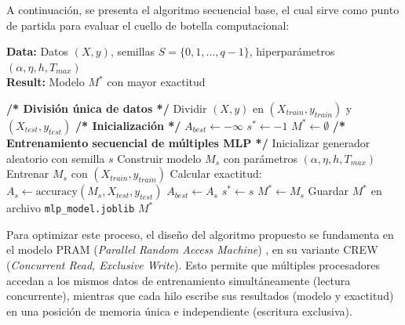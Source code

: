 \documentclass[11pt, a4paper]{article}
\begin{document}
A continuación, se presenta el algoritmo secuencial base, el cual sirve como punto de partida para evaluar el cuello de botella computacional:

\begin{algorithm}[H]
\caption{Entrenamiento secuencial de múltiples MLP con distintas semillas}
\textbf{Data:} Datos $(X, y)$, semillas $S = \{0, 1, \dots, q - 1\}$, hiperparámetros $(\alpha, \eta, h, T_{max})$\\
\textbf{Result:} Modelo $M^*$ con mayor exactitud
\begin{algorithmic}[1]
\State \textbf{/* División única de datos */}
\State Dividir $(X, y)$ en $(X_{train}, y_{train})$ y $(X_{test}, y_{test})$
\State \textbf{/* Inicialización */}
\State $A_{best} \gets -\infty$
\State $s^* \gets -1$
\State $M^* \gets \emptyset$
\State \textbf{/* Entrenamiento secuencial de múltiples MLP */}
    \State Inicializar generador aleatorio con semilla $s$
    \State Construir modelo $M_s$ con parámetros $(\alpha, \eta, h, T_{max})$
    \State Entrenar $M_s$ con $(X_{train}, y_{train})$
    \State Calcular exactitud: $A_s \gets \text{accuracy}(M_s, X_{test}, y_{test})$
        \State $A_{best} \gets A_s$
        \State $s^* \gets s$
        \State $M^* \gets M_s$
    \EndIf
\EndFor
\State Guardar $M^*$ en archivo \texttt{mlp\_model.joblib}
\State \Return $M^*$
\end{algorithmic}
\end{algorithm}


Para optimizar este proceso, el diseño del algoritmo propuesto se fundamenta en el modelo PRAM (\textit{Parallel Random Access Machine}) \cite{jaja1992parallel}, en su variante CREW (\textit{Concurrent Read, Exclusive Write}). Esto permite que múltiples procesadores accedan a los mismos datos de entrenamiento simultáneamente (lectura concurrente), mientras que cada hilo escribe sus resultados (modelo y exactitud) en una posición de memoria única e independiente (escritura exclusiva).
\end{document}

